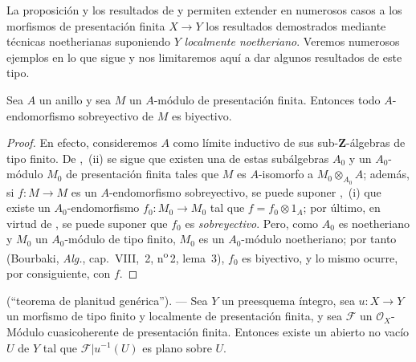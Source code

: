 \begin{env}[8.9.2]
\label{IV.8.9.2-fr}
La proposición  y los resultados de  y  permiten extender en numerosos casos a los morfismos de presentación finita $X\to Y$ los resultados demostrados mediante técnicas noetherianas suponiendo $Y$ \emph{localmente noetheriano}.
Veremos numerosos ejemplos en lo que sigue y nos limitaremos aquí a dar algunos resultados de este tipo.
\end{env}

\begin{proposition}[8.9.3]
\label{IV.8.9.3-fr}
Sea $A$ un anillo y sea $M$ un $A$-módulo de presentación finita.
Entonces todo $A$-endomorfismo sobreyectivo de $M$ es biyectivo.
\end{proposition}

\begin{proof}
En efecto, consideremos $A$ como límite inductivo de sus sub-$\mathbf Z$-álgebras de tipo finito.
De ,~(ii) se sigue que existen una de estas subálgebras $A_0$ y un $A_0$-módulo $M_0$ de presentación finita tales que $M$ es $A$-isomorfo a $M_0\otimes_{A_0}A$; además, si $f:M\to M$ es un $A$-endomorfismo sobreyectivo, se puede suponer ,~(i) que existe un $A_0$-endomorfismo $f_0:M_0\to M_0$ tal que $f=f_0\otimes1_A$; por último, en virtud de , se puede suponer que $f_0$ es \emph{sobreyectivo}.
Pero, como $A_0$ es noetheriano y $M_0$ un $A_0$-módulo de tipo finito, $M_0$ es un $A_0$-módulo noetheriano; por tanto (Bourbaki, \emph{Alg.}, cap.~VIII, \textsection\,2, n\textsuperscript{o}\,2, lema~3), $f_0$ es biyectivo, y lo mismo ocurre, por consiguiente, con $f$.
\end{proof}

\begin{proposition}[8.9.4]
\label{IV.8.9.4-fr}
(``teorema de planitud genérica''). --- Sea $Y$ un preesquema íntegro, sea $u:X\to Y$ un morfismo de tipo finito y localmente de presentación finita, y sea $\mathcal F$ un $\mathcal O_X$-Módulo cuasicoherente de presentación finita.
Entonces existe un abierto no vacío $U$ de $Y$ tal que $\mathcal F|u^{-1}(U)$ es plano sobre $U$.
\end{proposition}

